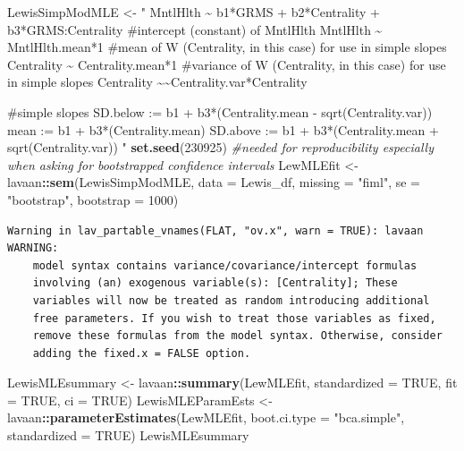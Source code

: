 \documentclass[
  11pt,
]{book}
\newenvironment{Shaded}{\begin{snugshade}}{\end{snugshade}}
\newcommand{\AttributeTok}[1]{\textcolor[rgb]{0.27,0.27,0.27}{#1}}
\newcommand{\CommentTok}[1]{\textcolor[rgb]{0.37,0.37,0.37}{\textit{#1}}}
\newcommand{\ConstantTok}[1]{\textcolor[rgb]{0.37,0.37,0.37}{#1}}
\newcommand{\DecValTok}[1]{\textcolor[rgb]{0.06,0.06,0.06}{#1}}
\newcommand{\FunctionTok}[1]{\textcolor[rgb]{0.27,0.27,0.27}{\textbf{#1}}}
\newcommand{\NormalTok}[1]{#1}
\newcommand{\OtherTok}[1]{\textcolor[rgb]{0.37,0.37,0.37}{#1}}
\newcommand{\SpecialCharTok}[1]{\textcolor[rgb]{0.43,0.43,0.43}{\textbf{#1}}}
\newcommand{\StringTok}[1]{\textcolor[rgb]{0.5,0.5,0.5}{#1}}
\begin{document}
\begin{Shaded}
\begin{Highlighting}[]
\NormalTok{LewisSimpModMLE }\OtherTok{\textless{}{-}} \StringTok{"}
\StringTok{    MntlHlth \textasciitilde{} b1*GRMS + b2*Centrality + b3*GRMS:Centrality}
\StringTok{    }
\StringTok{    \#intercept (constant) of MntlHlth}
\StringTok{    MntlHlth \textasciitilde{} MntlHlth.mean*1}
\StringTok{    \#mean of W (Centrality, in this case) for use in simple slopes}
\StringTok{    Centrality \textasciitilde{} Centrality.mean*1}
\StringTok{    \#variance of W (Centrality, in this case) for use in simple slopes}
\StringTok{    Centrality \textasciitilde{}\textasciitilde{}Centrality.var*Centrality}

\StringTok{    \#simple slopes}
\StringTok{    SD.below := b1 + b3*(Centrality.mean {-} sqrt(Centrality.var))}
\StringTok{    mean := b1 + b3*(Centrality.mean)}
\StringTok{    SD.above := b1 + b3*(Centrality.mean + sqrt(Centrality.var))}
\StringTok{"}
\FunctionTok{set.seed}\NormalTok{(}\DecValTok{230925}\NormalTok{)  }\CommentTok{\#needed for reproducibility especially when asking for bootstrapped confidence intervals}
\NormalTok{LewMLEfit }\OtherTok{\textless{}{-}}\NormalTok{ lavaan}\SpecialCharTok{::}\FunctionTok{sem}\NormalTok{(LewisSimpModMLE, }\AttributeTok{data =}\NormalTok{ Lewis\_df, }\AttributeTok{missing =} \StringTok{"fiml"}\NormalTok{,}
    \AttributeTok{se =} \StringTok{"bootstrap"}\NormalTok{, }\AttributeTok{bootstrap =} \DecValTok{1000}\NormalTok{)}
\end{Highlighting}
\end{Shaded}

\begin{verbatim}
Warning in lav_partable_vnames(FLAT, "ov.x", warn = TRUE): lavaan WARNING:
    model syntax contains variance/covariance/intercept formulas
    involving (an) exogenous variable(s): [Centrality]; These
    variables will now be treated as random introducing additional
    free parameters. If you wish to treat those variables as fixed,
    remove these formulas from the model syntax. Otherwise, consider
    adding the fixed.x = FALSE option.
\end{verbatim}

\begin{Shaded}
\begin{Highlighting}[]
\NormalTok{LewisMLEsummary }\OtherTok{\textless{}{-}}\NormalTok{ lavaan}\SpecialCharTok{::}\FunctionTok{summary}\NormalTok{(LewMLEfit, }\AttributeTok{standardized =} \ConstantTok{TRUE}\NormalTok{, }\AttributeTok{fit =} \ConstantTok{TRUE}\NormalTok{,}
    \AttributeTok{ci =} \ConstantTok{TRUE}\NormalTok{)}
\NormalTok{LewisMLEParamEsts }\OtherTok{\textless{}{-}}\NormalTok{ lavaan}\SpecialCharTok{::}\FunctionTok{parameterEstimates}\NormalTok{(LewMLEfit, }\AttributeTok{boot.ci.type =} \StringTok{"bca.simple"}\NormalTok{,}
    \AttributeTok{standardized =} \ConstantTok{TRUE}\NormalTok{)}
\NormalTok{LewisMLEsummary}
\end{Highlighting}
\end{Shaded}
\end{document}
